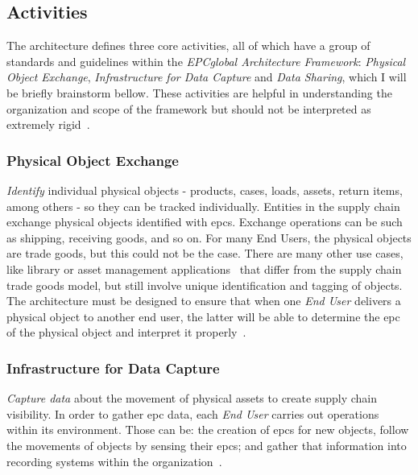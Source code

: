 \subsection{Activities} \label{sec:activities}

The architecture defines three core activities, all of which have a group of standards and guidelines within the \emph{EPCglobal Architecture Framework}: \emph{Physical Object Exchange}, \emph{Infrastructure for Data Capture} and \emph{Data Sharing}, which I will be briefly brainstorm bellow.
These activities are helpful in understanding the organization and scope of the framework but should not be interpreted as extremely rigid~\cite{GS1EPCglobalArchitecture}.

\subsubsection{Physical Object Exchange} 

\emph{Identify} individual physical objects - products, cases, loads, assets, return items, among others - so they can be tracked individually.
Entities in the supply chain exchange physical objects identified with \acp{epc}.
Exchange operations can be such as shipping, receiving goods, and so on.
For many End Users, the physical objects are trade goods, but this could not be the case.
There are many other use cases, like library or asset management applications~\cite{dong-yingliDesignInternetThings2016} that differ from the supply chain trade goods model, but still involve unique identification and tagging of objects. 
The architecture must be designed to ensure that when one \emph{End User} delivers a physical object to another end user, the latter will be able to determine the \ac{epc} of the physical object and interpret it properly~\cite{GS1EPCglobalArchitecture}.

\subsubsection{Infrastructure for Data Capture} 

\emph{Capture data} about the movement of physical assets to create supply chain visibility.
In order to gather \ac{epc} data, each \emph{End User} carries out operations within its environment. Those can be: the creation of \acp{epc} for new objects, follow the movements of objects by sensing their \acp{epc}; and gather that information into recording systems within the organization~\cite{GS1EPCglobalArchitecture}.

